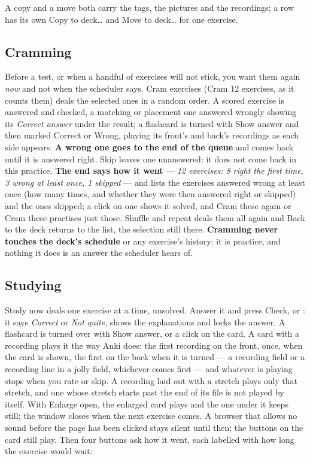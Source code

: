 \documentclass[11pt,oneside]{report}
\newcommand{\key}[1]{\textsf{\small\fbox{#1}}}
\newcommand{\menu}[1]{\textsf{#1}}
\begin{document}
\noindent A copy and a move both carry the tags, the pictures and the
recordings; a row has its own \menu{Copy to deck\ldots} and \menu{Move to
deck\ldots} for one exercise.

\subsection*{Cramming}

Before a test, or when a handful of exercises will not stick, you want them
again \emph{now} and not when the scheduler says. \menu{Cram exercises}
(\menu{Cram 12 exercises}, as it counts them) deals the selected ones in a
random order. A scored exercise is answered and checked, a matching or
placement one answered wrongly showing its \emph{Correct answer} under the
result; a flashcard is turned with \menu{Show answer} and then marked
\menu{Correct} or \menu{Wrong}, playing its front's and back's recordings as
each side appears. \textbf{A wrong one goes to the end of the queue} and
comes back until it is answered right. \menu{Skip} leaves one unanswered: it
does not come back in this practice. \textbf{The end says how it went} ---
\emph{12 exercises: 8 right the first time, 3 wrong at least once, 1
skipped} --- and lists the exercises answered wrong at least once (how many
times, and whether they were then answered right or skipped) and the ones
skipped; a click on one shows it solved, and \menu{Cram these again} or
\menu{Cram these} practises just those. \menu{Shuffle and repeat} deals them
all again and \menu{Back to the deck} returns to the list, the selection
still there. \textbf{Cramming never touches the deck's schedule}
or any exercise's history: it is practice, and nothing it does is an
answer the scheduler hears of.

\subsection*{Studying}

\menu{Study now} deals one exercise at a time, unsolved. Answer it and press
\menu{Check}, or \key{Enter}: it says \emph{Correct} or \emph{Not quite},
shows the explanations and locks the answer. A flashcard is turned over with
\menu{Show answer}, \key{Enter} or a click on the card. A card with a
recording plays it the way Anki does: the first recording on the front,
once, when the card is shown, the first on the back when it is turned --- a
recording field or a recording line in a jolly field, whichever comes first
--- and whatever is playing stops when you rate or skip. A recording laid
out with a stretch plays only that stretch, and one whose stretch starts
past the end of its file is not played by itself. With \menu{Enlarge} open, the
enlarged card plays and the one under it keeps still; the window closes
when the next exercise comes. A browser that allows no sound before the
page has been clicked stays silent until then; the buttons on the card
still play. Then four buttons ask how it went, each labelled with how long
the exercise would wait:
\end{document}
